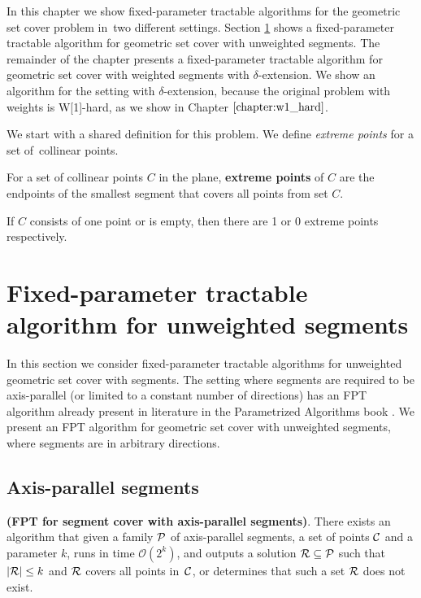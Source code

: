 In this chapter we show fixed-parameter tractable algorithms
for the geometric set cover problem in~two different settings.
Section \ref{section:fpt_unweighted} shows 
a fixed-parameter tractable algorithm for geometric set cover with unweighted segments.
The remainder of the chapter presents
a fixed-parameter tractable algorithm for geometric set cover with weighted segments
with $\delta$-extension.
We show an algorithm for the setting with $\delta$-extension,
because the original problem with weights is W[1]-hard,
as we show in Chapter $\ref{chapter:w1_hard}$.

We start with a shared definition for this problem.
We define \textit{extreme points} for a set of~collinear points.

\begin{defi}
	For a set of collinear points $C$ in the plane,
	\textbf{extreme points} of $C$ are the endpoints
	of the smallest segment that covers all points from set $C$.
	
	If $C$ consists of one point or is empty, then
	there are 1 or 0 extreme points respectively.
\end{defi}

\section{Fixed-parameter tractable algorithm for unweighted segments}
\label{section:fpt_unweighted}
In this section we consider fixed-parameter tractable
algorithms for unweighted geometric set cover with segments.
The setting where segments are required to be axis-parallel
(or limited to a constant number of directions) has an FPT
algorithm already present in literature in
the Parametrized Algorithms book \cite{platypus_book}.
We present an FPT algorithm for geometric set cover
with unweighted segments, where segments are in arbitrary directions.

\subsection{Axis-parallel segments}
\begin{tw}
	\textbf{(FPT for segment cover with axis-parallel segments)}.
	There exists an algorithm that given a family $\mathcal{P}$ of
	axis-parallel segments,
	a set of points $\mathcal{C}$
	and a parameter $k$,
	runs in time $\mathcal{O}(2^k)$,
	and outputs a solution $\mathcal{R} \subseteq \mathcal{P}$
	such that $|\mathcal{R}| \le k$ and $\mathcal{R}$ covers all points in~$\mathcal{C}$,
	or determines that such a set $\mathcal{R}$ does not exist.
\end{tw}

